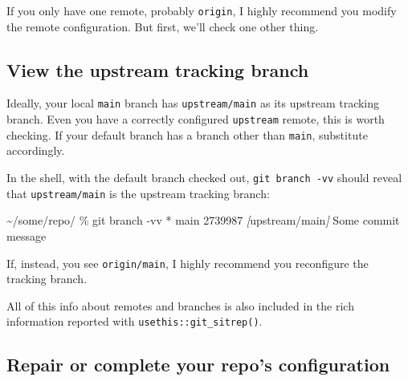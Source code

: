 \documentclass[
]{book}
\newenvironment{Shaded}{\begin{snugshade}}{\end{snugshade}}
\newcommand{\AttributeTok}[1]{\textcolor[rgb]{0.13,0.29,0.53}{#1}}
\newcommand{\CommentTok}[1]{\textcolor[rgb]{0.56,0.35,0.01}{\textit{#1}}}
\newcommand{\ExtensionTok}[1]{#1}
\newcommand{\FunctionTok}[1]{\textcolor[rgb]{0.13,0.29,0.53}{\textbf{#1}}}
\newcommand{\NormalTok}[1]{#1}
\newcommand{\PreprocessorTok}[1]{\textcolor[rgb]{0.56,0.35,0.01}{\textit{#1}}}
\newcommand{\SpecialStringTok}[1]{\textcolor[rgb]{0.31,0.60,0.02}{#1}}
\begin{document}
\begin{Shaded}
\end{Shaded}

If you only have one remote, probably \texttt{origin}, I highly recommend you modify the remote configuration.
But first, we'll check one other thing.

\subsection{View the upstream tracking branch}\label{view-the-upstream-tracking-branch}

Ideally, your local \texttt{main} branch has \texttt{upstream/main} as its upstream tracking branch.
Even you have a correctly configured \texttt{upstream} remote, this is worth checking.
If your default branch has a branch other than \texttt{main}, substitute accordingly.

In the shell, with the default branch checked out, \texttt{git\ branch\ -vv} should reveal that \texttt{upstream/main} is the upstream tracking branch:

\begin{Shaded}
\begin{Highlighting}[]
\ExtensionTok{\textasciitilde{}/some/repo/}\NormalTok{ \% git branch }\AttributeTok{{-}vv}                   
\ExtensionTok{*}\NormalTok{ main 2739987 }\PreprocessorTok{[}\SpecialStringTok{upstream/main}\PreprocessorTok{]}\NormalTok{ Some commit message}
\end{Highlighting}
\end{Shaded}

If, instead, you see \texttt{origin/main}, I highly recommend you reconfigure the tracking branch.

All of this info about remotes and branches is also included in the rich information reported with \texttt{usethis::git\_sitrep()}.

\subsection{Repair or complete your repo's configuration}\label{repair-or-complete-your-repos-configuration}
\end{document}

